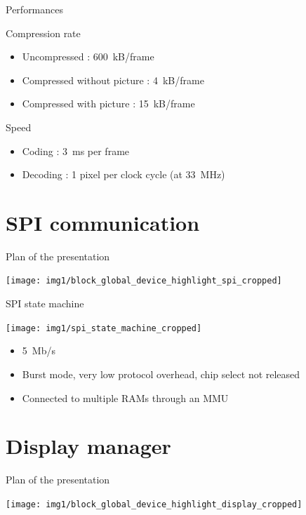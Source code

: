 \documentclass[10pt]{beamer}
\begin{document}
\begin{frame}{Performances}
    \begin{block}{Compression rate}
        \begin{itemize}
            \item Uncompressed : \SI{600}{kB/frame}
            \item Compressed without picture : \SI{4}{kB/frame}
            \item Compressed with picture : \SI{15}{kB/frame} 
        \end{itemize}
    \end{block}
        
    \begin{block}{Speed}
        \begin{itemize}
            \item Coding : \SI{3}{ms} per frame
            \item Decoding : 1 pixel per clock cycle (at \SI{33}{\mega\hertz})
        \end{itemize}
    \end{block}
\end{frame}

\section{SPI communication}
\begin{frame}{Plan of the presentation}
    \begin{center}
        \texttt{[image: img1/block\_global\_device\_highlight\_spi\_cropped]}
    \end{center}
\end{frame}

\begin{frame}{SPI state machine}
    \begin{center}
        \texttt{[image: img1/spi\_state\_machine\_cropped]}
    \end{center}

    \begin{itemize}
        \item \SI{5}{Mb/s}
        \item Burst mode, very low protocol overhead, chip select not released
        \item Connected to multiple RAMs through an MMU
    \end{itemize}
\end{frame}

\section{Display manager}
\begin{frame}{Plan of the presentation}
    \begin{center}
        \texttt{[image: img1/block\_global\_device\_highlight\_display\_cropped]}
    \end{center}
\end{frame}
\end{document}

